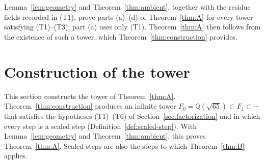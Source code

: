 \documentclass[11pt]{article}
\theoremstyle{plain}
\theoremstyle{definition}
\theoremstyle{remark}
\newcommand{\Q}{\mathbb Q}
\begin{document}
Lemma~\ref{lem:geometry} and Theorem~\ref{thm:ambient}, together with the residue fields recorded in (T1), prove parts
(a)--(d) of Theorem~\ref{thm:A} for every tower satisfying (T1)--(T3);
part (a) uses only (T1).  Theorem~\ref{thm:A} then follows from the
existence of such a tower, which Theorem~\ref{thm:construction} provides.

\section{Construction of the tower}\label{sec:construction}

This section constructs the tower of Theorem~\ref{thm:A}.
Theorem~\ref{thm:construction} produces an infinite tower
$F_0=\Q(\sqrt{65})\subset F_1\subset\cdots$ that satisfies the hypotheses
\textup{(T1)--(T6)} of Section~\ref{sec:factorization} and in which every
step is a scaled step (Definition~\ref{def:scaled-step}).  With
Lemma~\ref{lem:geometry} and Theorem~\ref{thm:ambient}, this proves
Theorem~\ref{thm:A}.  Scaled steps are also the steps to which
Theorem~\ref{thm:B} applies.
\end{document}
